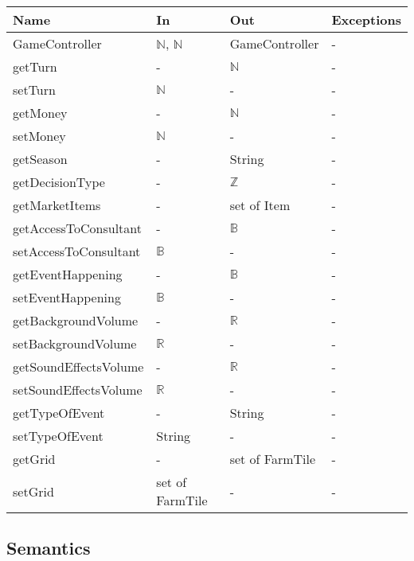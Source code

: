 \documentclass[12pt, titlepage]{article}
\begin{document}
\begin{center}
\begin{tabular}{p{4cm} p{4cm} p{4cm} p{4cm}}
\hline
\textbf{Name} & \textbf{In} & \textbf{Out} & \textbf{Exceptions} \\
\hline
GameController & $\mathbb{N}$, $\mathbb{N}$ & GameController & - \\
\hline
getTurn & - & $\mathbb{N}$ & - \\
\hline
setTurn & $\mathbb{N}$ &-& - \\
\hline
getMoney & - & $\mathbb{N}$ & - \\
\hline
setMoney & $\mathbb{N}$ &-& - \\
\hline
getSeason & - & String & - \\
\hline
getDecisionType & - &  $\mathbb{Z}$ & - \\
\hline
getMarketItems & - & set of Item & - \\
\hline
getAccessToConsultant & - & $\mathbb{B}$ & - \\
\hline
setAccessToConsultant & $\mathbb{B}$ & - & - \\
\hline
getEventHappening & - & $\mathbb{B}$ & - \\
\hline
setEventHappening & $\mathbb{B}$ & - & - \\
\hline
getBackgroundVolume & - & $\mathbb{R}$ & - \\
\hline
setBackgroundVolume & $\mathbb{R}$ & - & - \\
\hline
getSoundEffectsVolume & - & $\mathbb{R}$ & - \\
\hline
setSoundEffectsVolume & $\mathbb{R}$ & - & - \\
\hline
getTypeOfEvent & - & String & - \\
\hline
setTypeOfEvent & String & - & - \\
\hline
getGrid & - & set of FarmTile & - \\
\hline
setGrid & set of FarmTile & - & - \\
\hline
\end{tabular}
\end{center}

\subsection{Semantics}
\end{document}
